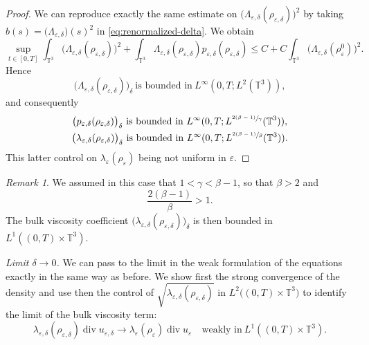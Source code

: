 \documentclass[10pt]{amsart}
\newcommand{\<}{\bigl\langle}
\renewcommand{\>}{\bigr\rangle}
\newcommand{\labeleq}[1]{}
\theoremstyle{definition}
\theoremstyle{remark}
\newtheorem{remark}{Remark}
\newcommand{\TT}{\mathbb{T}^3}
\DeclareMathOperator{\Div}{div}
\let\ep\varepsilon
\begin{document}
\begin{proof} We can reproduce exactly the same estimate on $\big(\Lambda_{\ep,\delta}(\rho_{\ep,\delta})\big)^{2}$ by taking $b(s) = \big(\Lambda_{\ep,\delta}\big)(s)^2$ in \eqref{eq:renormalized-delta}.
We obtain\vspace*{-3pt}
\begin{equation*}
\sup_{t \in [0,T]}\int_{\TT}{\big(\Lambda_{\ep,\delta}(\rho_{\ep,\delta})\big)^{2}}
+ \int_{\TT}{\Lambda_{\ep,\delta}(\rho_{\ep,\delta}) p_{\ep,\delta} (\rho_{\ep,\delta})}
\leq C + C\int_{\TT}{\big(\Lambda_{\ep,\delta}(\rho_{\ep}^0)\big)^{2}}.
\end{equation*}
Hence\vspace*{-3pt}
\begin{equation*}\labeleq{Lambdadelta3}
\big(\Lambda_{\ep,\delta}(\rho_{\ep,\delta})\big)_\delta ~ \text{is bounded in} ~ L^\infty(0,T;L^2(\TT)),
\end{equation*}
and consequently\vspace*{-3pt}
\begin{gather*}\labeleq{pdelta3}
\big(p_{\ep,\delta}(\rho_{\ep,\delta})\big)_\delta ~ \text{is bounded in} ~ L^\infty(0,T;L^{\sfrac{2(\beta-1)}{\gamma}}(\TT)),
\\
\labeleq{lambdadelta3}
\big(\lambda_{\ep,\delta}(\rho_{\ep,\delta})\big)_\delta ~ \text{is bounded in} ~ L^\infty(0,T;L^{\sfrac{2(\beta-1)}{\beta}}(\TT)).
\end{gather*}
This latter control on $\lambda_\ep(\rho_\ep)$ being not uniform in $\ep$.
\end{proof}

\begin{remark}\label{rk:control-lambda}
We assumed in this case that $1 <\gamma<\beta-1$, so that $\beta > 2$ and
\[
\dfrac{2(\beta-1)}{\beta} > 1.
\]
The bulk viscosity coefficient $\big(\lambda_{\ep,\delta}(\rho_{\ep,\delta})\big)_\delta$ is then bounded in $L^1((0,T) \times \TT)$.
\end{remark}

\noindent
\textit{Limit $\delta \rightarrow 0$.}
We can pass to the limit in the weak formulation of the equations exactly in the same way as before. We show first the strong convergence of the density and use then the control of $\sqrt{\lambda_{\ep,\delta}(\rho_{\ep,\delta})}$ in $L^2\big((0,T)\times \TT\big)$ to identify the limit of the bulk viscosity term:
\[
\lambda_{\ep,\delta}(\rho_{\ep,\delta})\Div u_{\ep,\delta}
\to
\lambda_\ep(\rho_\ep)\Div u_\ep\quad \text{weakly in}~ L^1((0,T)\times \TT).
\]
\end{document}
